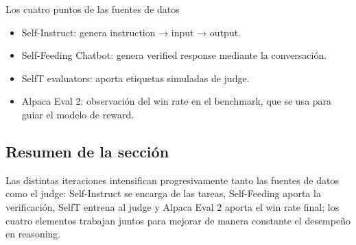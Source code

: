 \begin{importantbox}{Los cuatro puntos de las fuentes de datos}
\begin{itemize}
    \item Self-Instruct: genera instruction → input → output.
    \item Self-Feeding Chatbot: genera verified response mediante la conversación.
    \item SelfT evaluators: aporta etiquetas simuladas de judge.
    \item Alpaca Eval 2: observación del win rate en el benchmark, que se usa para guiar el modelo de reward.
\end{itemize}
\end{importantbox}

\subsection{Resumen de la sección}
Las distintas iteraciones intensifican progresivamente tanto las fuentes de datos como el judge: Self-Instruct se encarga de las tareas, Self-Feeding aporta la verificación, SelfT entrena al judge y Alpaca Eval 2 aporta el win rate final; los cuatro elementos trabajan juntos para mejorar de manera constante el desempeño en reasoning.

